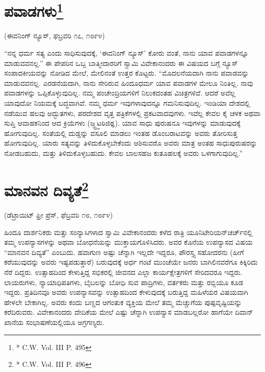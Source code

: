 \delimiter


\section[ಪವಾಡಗಳು]{ಪವಾಡಗಳು\protect\footnote{* C.W. Vol. III P. 495}}

\begin{center}
(ಈವನಿಂಗ್​ ನ್ಯೂಸ್​, ಫಬ್ರವರಿ ೧೭, ೧೮೯೪)
\end{center}

“ನನ್ನ ಧರ್ಮ ಸತ್ಯ ಎಂದು ಸಾಧಿಸುವುದಕ್ಕೆ, ‘ಈವನಿಂಗ್​ ನ್ಯೂಸ್​’ ಕೋರು ವಂತೆ, ನಾನು ಯಾವ ಪವಾಡಗಳನ್ನೂ ಮಾಡುವವನಲ್ಲ.” ಈ ಪೇಪರಿನ ಒಬ್ಬ ಬಾತ್ಮೀದಾರರಿಗೆ ಸ್ವಾಮಿ ವಿವೇಕಾನಂದರು ಈ ವಿಷಯದ ಬಗ್ಗೆ ನ್ಯೂಸ್​ ಸಂಪಾದಕೀಯವನ್ನು ನೋಡಿದ ಮೇಲೆ, ಮೇಲಿನಂತೆ ಉತ್ತರ ಕೊಟ್ಟರು. “ಮೊದಲನೆಯದಾಗಿ ನಾನು ಪವಾಡವನ್ನು ಮಾಡುವವನಲ್ಲ. ಎರಡನೆಯದಾಗಿ, ನಾನು ಸೇರಿರುವ ಹಿಂದೂಧರ್ಮ ಯಾವ ಪವಾಡಗಳ ಮೇಲೂ ನಿಂತಿಲ್ಲ. ನಾವು ಪವಾಡಗಳನ್ನು ಒಪ್ಪಿಕೊಳ್ಳುವುದಿಲ್ಲ. ನಮ್ಮ ಪಂಚೇಂದ್ರಿಯಗಳಿಗೆ ನಿಲುಕದಂತಹ ವಿಚಿತ್ರಗಳಿವೆ. ಆದರೆ ಅವೆಲ್ಲ ಯಾವುದೋ ನಿಯಮಕ್ಕೆ ಬದ್ಧವಾಗಿವೆ. ನಮ್ಮ ಧರ್ಮ ಇವುಗಳಾವುದನ್ನೂ ಗಮನಿಸುವುದಿಲ್ಲ. ಇಂಡಿಯಾ ದೇಶದಲ್ಲಿ ನಡೆಯುವ ಹಲವು ಅದ್ಭುತಗಳು, ಪರದೇಶದ ವೃತ್ತ ಪತ್ರಿಕೆಗಳಲ್ಲಿ ಪ್ರಕಟವಾದವುಗಳು. ಇವೆಲ್ಲ ಕೇವಲ ಕೈ ಚಳಕ ಅಥವಾ ಸುಪ್ತಿ ಆವಾಹಕನಿಂದ ಆದ ಕ್ರಿಯೆಗಳು (ಜ್ಢ್ಟ್ಞಟಠಿಜಿಠ್ಞ). ಯಾವ ಸಾಧು ಪುರುಷನೂ ಇವುಗಳನ್ನು ಮಾಡುವುದಕ್ಕೆ ಹೋಗುವುದಿಲ್ಲ. ಸಂತೆಯಲ್ಲಿ ದುಡ್ಡನ್ನು ವಸೂಲಿ ಮಾಡಲು ಇಂತಹ ಡೊಂಬರಾಟವನ್ನು ಅವರು ತೋರಿಸುತ್ತ ಹೋಗುವುದಿಲ್ಲ. ಯಾರು ಸತ್ಯವನ್ನು ತಿಳಿದುಕೊಳ್ಳಬೇಕೆಂದು ಆಶಿಸುವರೊ ಅವರು ಮಾತ್ರ ಅಂತಹ ಸಾಧುಪುರುಷರನ್ನು ನೋಡಬಹುದು, ಮತ್ತು ತಿಳಿದುಕೊಳ್ಳಬಹುದು. ಕೇವಲ ಬಾಲಸಹಜ ಕುತೂಹಲಕ್ಕೆ ಅವರು ಒಳಗಾಗುವುದಿಲ್ಲ.”

\delimiter


\section[ಮಾನವನ ದಿವ್ಯತೆ]{ಮಾನವನ ದಿವ್ಯತೆ\protect\footnote{* C.W. Vol. III P. 496}}

\begin{center}
(ಡೆಟ್ರಾಯಿಟ್​ ಫ್ರೀ ಪ್ರೆಸ್​, ಫೆಬ್ರವರಿ ೧೮, ೧೮೯೪)
\end{center}

ಹಿಂದೂ ದಾರ್ಶನಿಕರು ಮತ್ತು ಸಂನ್ಯಾಸಿಗಳಾದ ಸ್ವಾಮಿ ವಿವೇಕಾನಂದರು ಕಳೆದ ರಾತ್ರಿ ಯೂನಿಟೇರಿಯನ್​ ಚರ್ಚ್​ನಲ್ಲಿ ತಮ್ಮ ಉಪನ್ಯಾಸಗಳನ್ನು ಅಥವಾ ಬೋಧನೆಯನ್ನು ಮುಕ್ತಾಯಗೊಳಿಸಿದರು. ಅವರ ಕೊನೆಯ ಉಪನ್ಯಾಸದ ವಿಷಯ “ಮಾನವನ ದಿವ್ಯತೆ” ಎಂಬುದು. ಹವಾಗುಣ ಅಷ್ಟು ಚೆನ್ನಾಗಿ ಇಲ್ಲದೇ ಇದ್ದರೂ, ಪೌರಸ್ತ್ಯ ಸಹೋದರನು (ಹೀಗೆ ಕರೆಯುವುದನ್ನು ಅವರು ಇಷ್ಟಪಡುತ್ತಾರೆ) ಬರುವುದಕ್ಕೆ ಅರ್ಧ ಗಂಟೆ ಮುಂಚೆಯೇ ಜನರು ಬಾಗಿಲಿನವರೆಗೂ ಕಿಕ್ಕಿರಿದು ನೆರೆ ದಿದ್ದರು. ಉತ್ಸಾಹದಿಂದ ಕೇಳುತ್ತಿದ್ದ ಸಭಿಕರಲ್ಲಿ ಜೀವನದ ಎಲ್ಲಾ ಕಾರ್ಯಕ್ಷೇತ್ರಗಳಿಗೆ ಸೇರಿದವರೂ ಇದ್ದರು. ಲಾಯರುಗಳು, ನ್ಯಾಯಾಧಿಪತಿಗಳು, ಬೈಬಲನ್ನು ಬೋಧಿ ಸುವ ಪಾದ್ರಿಗಳು, ವರ್ತಕರು ಮತ್ತು ರಬ್ಬಿಯೂ ಕೂಡ ಇದ್ದರು. ಪ್ರತಿದಿನವೂ ಅವರು ಉಪನ್ಯಾಸವನ್ನು ಉತ್ಸಾಹದಿಂದ ಕೇಳುವುದಕ್ಕೆ ಬರುತ್ತಿದ್ದ ಮಹಿಳೆಯರ ವಿಷಯವಾಗಿ ಹೇಳಲೇ ಬೇಕಾಗಿಲ್ಲ. ಅವರು ಕಂದು ಬಣ್ಣದ ಆಗಂತುಕ ವ್ಯಕ್ತಿಯ ಮೇಲೆ ತಮ್ಮ ಮೆಚ್ಚುಗೆಯ ಪುಷ್ಪವೃಷ್ಟಿಯನ್ನು ಕರೆದಿರುವರು. ವಿವೇಕಾನಂದರು ವೇದಿಕೆಯ ಮೇಲೆ ಎಷ್ಟು ಚೆನ್ನಾಗಿ ಉಪನ್ಯಾಸ ಮಾಡಬಲ್ಲರೋ ಹಾಗೆಯೇ ದಿವಾನ್​ ಖಾನೆಯ ಸಂಭಾಷಣೆಯಲ್ಲಿಯೂ ಅಗ್ರಗಣ್ಯರು.

